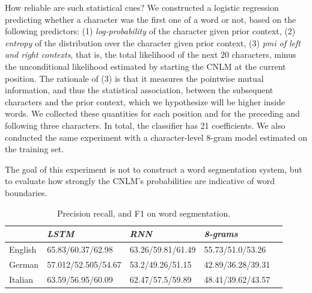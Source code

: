 How reliable are such statistical cues?
We constructed a logistic regression predicting whether a character was the first one of a word or not, based on the following predictors:
(1) \emph{log-probability} of the character given prior context, (2) \emph{entropy} of the distribution over the character given prior context, (3) \emph{pmi of left and right contexts}, that is, the total likelihood of the next 20 characters, minus the unconditional likelihood estimated by starting the CNLM at the current position.
The rationale of (3) is that it measures the pointwise mutual information, and thus the statistical association, between the subsequent characters and the prior context, which we hypothesize will be higher inside words.
We collected these quantities for each position and for the preceding and following three characters.
In total, the classifier has 21 coefficients.
We also conducted the same experiment with a character-level 8-gram model estimated on the training set.

The goal of this experiment is not to construct a word segmentation system, but to evaluate how strongly the CNLM's probabilities are indicative of word boundaries.


\begin{table}[t]
  \begin{center}
    \begin{tabular}{l|l|l|l|l}
      \multicolumn{1}{c}{}&\emph{LSTM}&\emph{RNN}&\emph{8-grams}\\
      \hline
      English & 65.83/60.37/62.98 &   63.26/59.81/61.49 & 55.73/51.0/53.26    \\ %
      German &  57.012/52.505/54.67 &  53.2/49.26/51.15 & 42.89/36.28/39.31   \\ %
      Italian &  63.59/56.95/60.09 & 62.47/57.5/59.89  & 48.41/39.62/43.57    \\ %
    \end{tabular}
  \end{center}
  \caption{\label{tab:segmentation-results} Precision recall, and F1 on word segmentation.}
\end{table}


